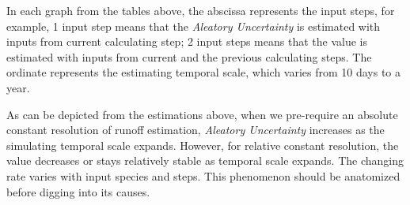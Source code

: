 \documentclass[draft,wrr]{AGUTeX}
\begin{document}
\begin{article}
In each graph from the tables above, the abscissa represents the input steps, for example, 1 input step  means that the \emph{Aleatory Uncertainty} is estimated with inputs from current calculating step; 2 input steps means that  the value is estimated with inputs from current and the previous calculating steps. The ordinate represents the estimating temporal scale, which varies from 10 days to a year. 

As can be depicted from the estimations above, when we pre-require an absolute constant resolution of runoff estimation, \emph{Aleatory Uncertainty} increases as the simulating temporal scale expands. However, for relative constant resolution, the value decreases or stays relatively stable as temporal scale expands. The changing rate varies with input species and steps.  This phenomenon should be anatomized before digging into its causes.
\fi

\end{article}
\end{document}
